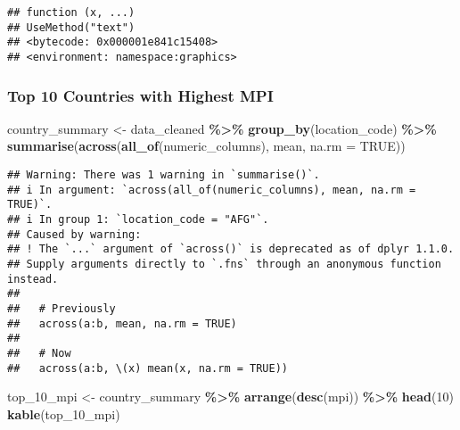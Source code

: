 \documentclass[
]{article}
\newenvironment{Shaded}{\begin{snugshade}}{\end{snugshade}}
\newcommand{\AttributeTok}[1]{\textcolor[rgb]{0.13,0.29,0.53}{#1}}
\newcommand{\ConstantTok}[1]{\textcolor[rgb]{0.56,0.35,0.01}{#1}}
\newcommand{\DecValTok}[1]{\textcolor[rgb]{0.00,0.00,0.81}{#1}}
\newcommand{\FunctionTok}[1]{\textcolor[rgb]{0.13,0.29,0.53}{\textbf{#1}}}
\newcommand{\NormalTok}[1]{#1}
\newcommand{\OtherTok}[1]{\textcolor[rgb]{0.56,0.35,0.01}{#1}}
\newcommand{\SpecialCharTok}[1]{\textcolor[rgb]{0.81,0.36,0.00}{\textbf{#1}}}
\begin{document}
\begin{verbatim}
## function (x, ...) 
## UseMethod("text")
## <bytecode: 0x000001e841c15408>
## <environment: namespace:graphics>
\end{verbatim}

\hypertarget{top-10-countries-with-highest-mpi}{%
\subsubsection{Top 10 Countries with Highest
MPI}\label{top-10-countries-with-highest-mpi}}

\begin{Shaded}
\begin{Highlighting}[]
\NormalTok{country\_summary }\OtherTok{\textless{}{-}}\NormalTok{ data\_cleaned }\SpecialCharTok{\%\textgreater{}\%}
\FunctionTok{group\_by}\NormalTok{(location\_code) }\SpecialCharTok{\%\textgreater{}\%}
\FunctionTok{summarise}\NormalTok{(}\FunctionTok{across}\NormalTok{(}\FunctionTok{all\_of}\NormalTok{(numeric\_columns), mean, }\AttributeTok{na.rm =} \ConstantTok{TRUE}\NormalTok{))}
\end{Highlighting}
\end{Shaded}

\begin{verbatim}
## Warning: There was 1 warning in `summarise()`.
## i In argument: `across(all_of(numeric_columns), mean, na.rm = TRUE)`.
## i In group 1: `location_code = "AFG"`.
## Caused by warning:
## ! The `...` argument of `across()` is deprecated as of dplyr 1.1.0.
## Supply arguments directly to `.fns` through an anonymous function instead.
## 
##   # Previously
##   across(a:b, mean, na.rm = TRUE)
## 
##   # Now
##   across(a:b, \(x) mean(x, na.rm = TRUE))
\end{verbatim}

\begin{Shaded}
\begin{Highlighting}[]
\NormalTok{top\_10\_mpi }\OtherTok{\textless{}{-}}\NormalTok{ country\_summary }\SpecialCharTok{\%\textgreater{}\%}
\FunctionTok{arrange}\NormalTok{(}\FunctionTok{desc}\NormalTok{(mpi)) }\SpecialCharTok{\%\textgreater{}\%}
\FunctionTok{head}\NormalTok{(}\DecValTok{10}\NormalTok{)}
\FunctionTok{kable}\NormalTok{(top\_10\_mpi)}
\end{Highlighting}
\end{Shaded}
\end{document}
